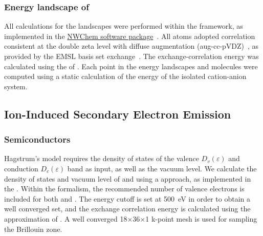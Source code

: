 \begin{refsection}
 \label{appendix:sec-landscape}
\subsubsection{Energy landscape of \ce{[CB11H12]^{-}}}

All calculations for the landscapes were performed within the  framework, as implemented in the \href{http://www.nwchem-sw.org/index.php/Main_Page}{NWChem software package}~\cite{Valiev2010}. All atoms adopted correlation consistent  at the double zeta level with diffuse augmentation (aug-cc-pVDZ)~\cite{Dunning1989, Kendall1992, Prascher2010}, as provided by the EMSL basis set exchange~\cite{Feller1996, Schuchardt2007}. The exchange-correlation energy was calculated using the  of . Each point in the energy landscapes  and  molecules were computed using a static calculation of the energy of the isolated cation-anion system.

\subsection{Ion-Induced Secondary Electron Emission} \label{appendix:sec-quotas} 
 
\subsubsection{Semiconductors} \label{appendix:sec-semiconductors} 

Hagstrum's model requires the density of states of the valence 
$D_v(\varepsilon)$ and conduction $D_c(\varepsilon)$ band as input, as well as 
the vacuum level. We calculate the density of states and vacuum level of 
 and  using a  approach, as implemented in 
the . Within the  formalism, the recommended number of 
valence electrons is included for both  and . The energy cutoff 
is set at 500~\si{\electronvolt} in order to obtain a well converged 
 set, and the exchange correlation energy is calculated 
using the  approximation of . A well converged 
18$\times$36$\times$1  k-point mesh is used for sampling the 
Brillouin zone.
  

\end{refsection}
